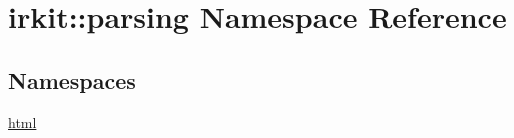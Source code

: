 \hypertarget{namespaceirkit_1_1parsing}{}\section{irkit\+:\+:parsing Namespace Reference}
\label{namespaceirkit_1_1parsing}
\subsection*{Namespaces}
\begin{DoxyCompactItemize}
\item 
 \mbox{\hyperlink{namespaceirkit_1_1parsing_1_1html}{html}}
\end{DoxyCompactItemize}

